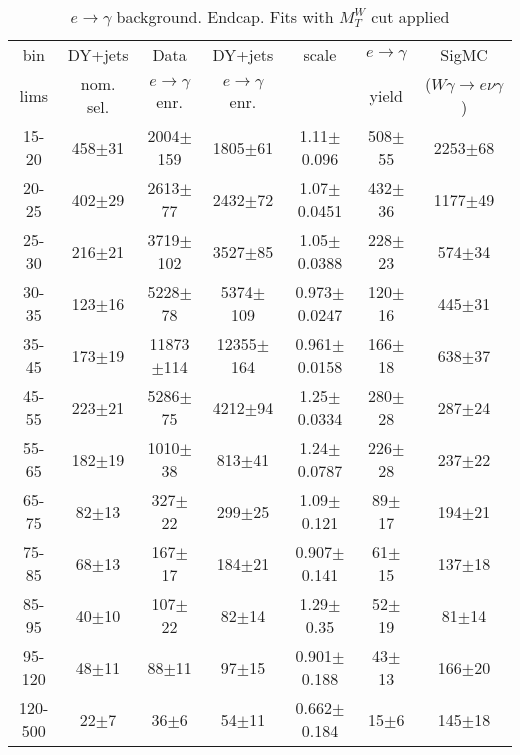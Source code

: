 \begin{table}[h]
  \scriptsize
  \begin{center}
  \caption{$e\rightarrow\gamma$ background. Endcap. Fits with $M_T^W$ cut applied }  
  \begin{tabular}{|c|c|c|c|c|c|c|}
 bin  & DY+jets    & Data                      & DY+jets & scale & $e\rightarrow\gamma$ & SigMC\\ 
 lims & nom. sel. & $e\rightarrow\gamma$ enr. & $e\rightarrow\gamma$ enr. & & yield & ($W\gamma\rightarrow e\nu\gamma$)\\ \hline
15-20 & 458$\pm$31 & 2004$\pm$159 & 1805$\pm$61 & 1.11$\pm$0.096& 508$\pm$55& 2253$\pm$68 \\ \hline
20-25 & 402$\pm$29 & 2613$\pm$77 & 2432$\pm$72 & 1.07$\pm$0.0451& 432$\pm$36& 1177$\pm$49 \\ \hline
25-30 & 216$\pm$21 & 3719$\pm$102 & 3527$\pm$85 & 1.05$\pm$0.0388& 228$\pm$23& 574$\pm$34 \\ \hline
30-35 & 123$\pm$16 & 5228$\pm$78 & 5374$\pm$109 & 0.973$\pm$0.0247& 120$\pm$16& 445$\pm$31 \\ \hline
35-45 & 173$\pm$19 & 11873$\pm$114 & 12355$\pm$164 & 0.961$\pm$0.0158& 166$\pm$18& 638$\pm$37 \\ \hline
45-55 & 223$\pm$21 & 5286$\pm$75 & 4212$\pm$94 & 1.25$\pm$0.0334& 280$\pm$28& 287$\pm$24 \\ \hline
55-65 & 182$\pm$19 & 1010$\pm$38 & 813$\pm$41 & 1.24$\pm$0.0787& 226$\pm$28& 237$\pm$22 \\ \hline
65-75 & 82$\pm$13 & 327$\pm$22 & 299$\pm$25 & 1.09$\pm$0.121& 89$\pm$17& 194$\pm$21 \\ \hline
75-85 & 68$\pm$13 & 167$\pm$17 & 184$\pm$21 & 0.907$\pm$0.141& 61$\pm$15& 137$\pm$18 \\ \hline
85-95 & 40$\pm$10 & 107$\pm$22 & 82$\pm$14 & 1.29$\pm$0.35& 52$\pm$19& 81$\pm$14 \\ \hline
95-120 & 48$\pm$11 & 88$\pm$11 & 97$\pm$15 & 0.901$\pm$0.188& 43$\pm$13& 166$\pm$20 \\ \hline
120-500 & 22$\pm$7 & 36$\pm$6 & 54$\pm$11 & 0.662$\pm$0.184& 15$\pm$6& 145$\pm$18 \\ \hline
  \end{tabular}
  \label{tab:EtoGAMMA_1}
  \end{center}
\end{table}


